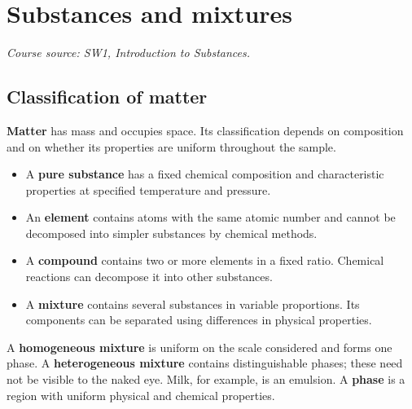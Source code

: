 \documentclass[a4paper,10pt]{article}
\newcommand{\source}[1]{{\small\textit{Course source: #1.}\par}}
\begin{document}
\section{Substances and mixtures}
\label{sec:matter}
\source{SW1, Introduction to Substances}

\subsection{Classification of matter}
\textbf{Matter} has mass and occupies space. Its classification depends on
composition and on whether its properties are uniform throughout the sample.
\begin{itemize}
  \item A \textbf{pure substance} has a fixed chemical composition and characteristic
  properties at specified temperature and pressure.
  \item An \textbf{element} contains atoms with the same atomic number and cannot
  be decomposed into simpler substances by chemical methods.
  \item A \textbf{compound} contains two or more elements in a fixed ratio.
  Chemical reactions can decompose it into other substances.
  \item A \textbf{mixture} contains several substances in variable proportions.
  Its components can be separated using differences in physical properties.
\end{itemize}

\begin{center}
\end{center}

A \textbf{homogeneous mixture} is uniform on the scale considered and forms
one phase. A \textbf{heterogeneous mixture} contains distinguishable phases;
these need not be visible to the naked eye. Milk, for example, is an emulsion.
A \textbf{phase} is a region with uniform physical and chemical properties.
\end{document}
